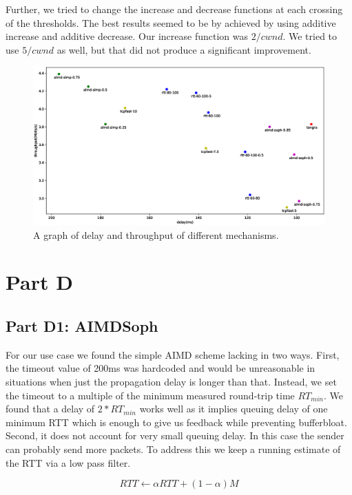 \documentclass[12pt]{article}
\begin{document}
Further, we tried to change the increase and decrease functions at each crossing
of the thresholds. The best results seemed to be by achieved by using additive
increase and additive decrease. Our increase function was $2/cwnd$. We tried to
use $5/cwnd$ as well, but that did not produce a significant improvement.

\begin{figure}[h]
 \includegraphics[width=\textwidth,height=\textheight,keepaspectratio]{figure_1.eps}
 \caption{A graph of delay and throughput of different mechanisms.}
 \label{fig:all}
\end{figure}

\section*{Part D}

\subsection*{Part D1: AIMDSoph}

For our use case we found the simple AIMD scheme lacking in two ways. First, the
timeout value of 200ms was hardcoded and would be unreasonable in situations
when just the propagation delay is longer than that. Instead, we set the timeout
to a multiple of the minimum measured round-trip time $RT_{min}$. We found that
a delay of $2*RT_{min}$ works well as it implies queuing delay of one minimum
RTT which is enough to give us feedback while preventing bufferbloat. Second, it
does not account for very small queuing delay. In this case the sender can
probably send more packets. To address this we keep a running estimate of the
RTT via a low pass filter. \cite{jacobson}

$${RTT} \leftarrow \alpha {RTT} + \left(1 - \alpha\right)M$$
\end{document}
